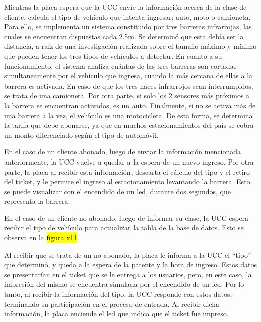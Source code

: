 Mientras la placa espera que la UCC envíe la información acerca de la clase de cliente, calcula el tipo de vehículo que intenta ingresar: auto, moto o camioneta. Para ello, se implementa un sistema constituido por tres barreras infrarrojas, las cuales se encuentran dispuestas cada 2.5m. Se determinó que esta debía ser la distancia, a raíz de una investigación realizada sobre el tamaño máximo y mínimo que pueden tener los tres tipos de vehículos a detectar. En cuanto a su funcionamiento, el sistema analiza cuántas de las tres barreras son cortadas simultaneamente por el vehículo que ingresa, cuando la más cercana de ellas a la barrera es activada. En caso de que los tres haces infrarrojos sean interrumpidos, se trata de una camioneta. Por otra parte, si solo los 2 sensores más próximos a la barrera se encuentran activados, es un auto. Finalmente, si no se activa más de una barrera a la vez, el vehículo es una motocicleta. De esta forma, se determina la tarifa que debe abonarse, ya que en muchos estacionamientos del país se cobra un monto diferenciado según el tipo de automóvil.

En el caso de un cliente abonado, luego de enviar la información mencionada anteriormente, la UCC vuelve a quedar a la espera de un nuevo ingreso. Por otra parte, la placa al recibir esta información, descarta el cálculo del tipo y el retiro del ticket, y le permite el ingreso al estacionamiento levantando la barrera. Esto se puede visualizar con el encendido de un led, durante dos segundos, que representa la barrera.

En el caso de un cliente no abonado, luego de informar su clase, la UCC espera recibir el tipo de vehículo para actualizar la tabla de la base de datos. Esto se observa en la \hl{figura x11}. 


Al recibir que se trata de un no abonado, la placa le informa a la UCC el ``tipo'' que determinó, y queda a la espera de la patente y la hora de ingreso. Estos datos se presentarían en el ticket que se le entrega a los usuarios, pero, en este caso, la impresión del mismo se encuentra simulada por el encendido de un led. Por lo tanto, al recibir la información del tipo, la UCC responde con estos datos, terminando su participación en el proceso de entrada. Al recibir dicha información, la placa enciende el led que indica que el ticket fue impreso. 

